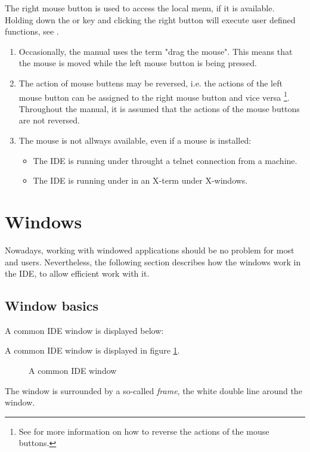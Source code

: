 The right mouse button is used to access the local menu, if
it is available. Holding down the  or  key and 
clicking the right button will execute user defined functions, 
see .

\begin{remark}
\begin{enumerate}
\item Occasionally, the manual uses the term "drag the mouse". This
means that the mouse is moved while the left mouse button is being 
pressed.
\item 
The action of mouse buttens may be reversed, i.e. the actions of the left
mouse button can be assigned to the right mouse button and vice versa  
\footnote{See  for more information on how to reverse the
actions of the mouse buttons.}. Throughout the manual, it is assumed 
that the actions of the mouse buttons are not reversed.
\item
The mouse is not allways available, even if a mouse is installed:
\begin{itemize}
\item The IDE is running under \linux throught a telnet connection from 
a \windows machine.
\item The IDE is running under \linux in an X-term under X-windows.
\end{itemize}
\end{enumerate}
\end{remark}

\section{Windows}
\label{se:windows}
Nowadays, working with windowed applications should be no problem for
most \windows and \linux users. Nevertheless, the following section 
describes how the windows work in the \fpc IDE, to allow efficient 
work with it.
%
%
\subsection{Window basics}
\label{se:windowbasics}
\begin{htmlonly}
A common IDE window is displayed  below:
\end{htmlonly}
\begin{latexonly}
A common IDE window is displayed in figure \ref{fig:idewin}.
\begin{figure}
\caption{A common IDE window}
\label{fig:idewin}
\ifpdf
{}
\else
{}
\fi
\end{figure}
\end{latexonly}
The window is surrounded by a so-called \emph{frame}, the white double
line around the window. 

